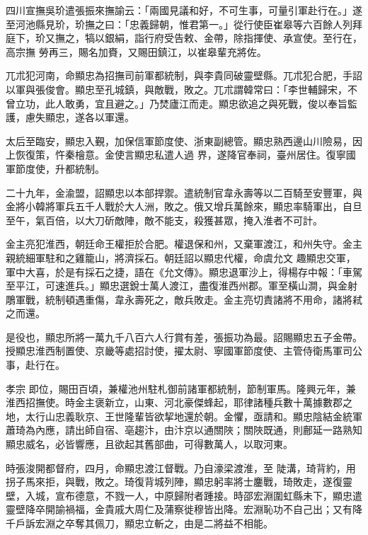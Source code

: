 \begin{pinyinscope}
 四川宣撫吳玠遣張振來撫諭云：「兩國見議和好，不可生事，可量引軍赴行在。」遂至河池縣見玠，玠撫之曰：「忠義歸朝，惟君第一。」從行使臣崔皋等六百餘人列拜庭下，玠又撫之，犒以銀絹，詣行府受告敕、金帶，除指揮使、承宣使。至行在，高宗撫
 勞再三，賜名加賚，又賜田鎮江，以崔皋輩充將佐。



 兀朮犯河南，命顯忠為招撫司前軍都統制，與李貴同破靈壁縣。兀朮犯合肥，手詔以軍與張俊會。顯忠至孔城鎮，與敵戰，敗之。兀朮謂韓常曰：「李世輔歸宋，不曾立功，此人敢勇，宜且避之。」乃焚廬江而走。顯忠欲追之與死戰，俊以奉旨監護，慮失顯忠，遂各以軍還。



 太后至臨安，顯忠入覲，加保信軍節度使、浙東副總管。顯忠熟西邊山川險易，因上恢復策，忤秦檜意。金使言顯忠私遣人過
 界，遂降官奉祠，臺州居住。復寧國軍節度使，升都統制。



 二十九年，金渝盟，詔顯忠以本部捍禦。遣統制官韋永壽等以二百騎至安豐軍，與金將小韓將軍兵五千人戰於大人洲，敗之。俄又增兵萬餘來，顯忠率騎軍出，自旦至午，氣百倍，以大刀斫敵陣，敵不能支，殺獲甚眾，掩入淮者不可計。



 金主亮犯淮西，朝廷命王權拒於合肥。權退保和州，又棄軍渡江，和州失守。金主親統細軍駐和之雞籠山，將濟採石。朝廷詔以顯忠代權，命虞允文
 趣顯忠交軍，軍中大喜，於是有採石之捷，語在《允文傳》。顯忠退軍沙上，得楊存中報：「車駕至平江，可速進兵。」顯忠選銳士萬人渡江，盡復淮西州郡。軍至橫山澗，與金射鵰軍戰，統制頓遇重傷，韋永壽死之，敵兵敗走。金主亮切責諸將不用命，諸將弒之而還。



 是役也，顯忠所將一萬九千八百六人行賞有差，張振功為最。詔賜顯忠五子金帶。授顯忠淮西制置使、京畿等處招討使，擢太尉、寧國軍節度使、主管侍衛馬軍司公事，赴行在。



 孝宗
 即位，賜田百頃，兼權池州駐札御前諸軍都統制，節制軍馬。隆興元年，兼淮西招撫使。時金主褒新立，山東、河北豪傑蜂起，耶律諸種兵數十萬據數郡之地，太行山忠義耿京、王世隆輩皆欲挈地還於朝。金懼，亟請和。顯忠陰結金統軍蕭琦為內應，請出師自宿、亳趨汴，由汴京以通關陜；關陜既通，則鄜延一路熟知顯忠威名，必皆響應，且欲起其舊部曲，可得數萬人，以取河東。



 時張浚開都督府，四月，命顯忠渡江督戰。乃自濠梁渡淮，至
 陡溝，琦背約，用拐子馬來拒，與戰，敗之。琦復背城列陣，顯忠躬率將士鏖戰，琦敗走，遂復靈壁，入城，宣布德意，不戮一人，中原歸附者踵接。時邵宏淵圍虹縣未下，顯忠遣靈壁降卒開諭禍福，金貴戚大周仁及蒲察徙穆皆出降。宏淵恥功不自己出；又有降千戶訴宏淵之卒奪其佩刀，顯忠立斬之，由是二將益不相能。




\end{pinyinscope}
